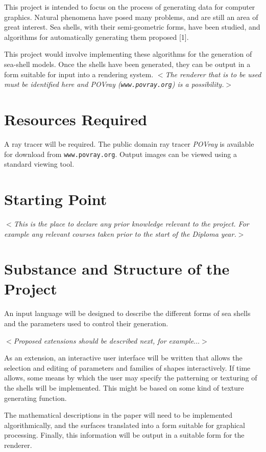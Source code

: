 \documentclass[12pt]{article}
\newcommand{\al}{$<$}
\newcommand{\ar}{$>$}
\begin{document}
This project is intended to focus on the process of generating data
for computer graphics. Natural phenomena have posed many problems, and
are still an area of great interest.  Sea shells, with their
semi-geometric forms, have been studied, and algorithms for
automatically generating them proposed [1].

This project would involve implementing these algorithms for the
generation of sea-shell models.  Once the shells have been generated,
they can be output in a form suitable for input into a rendering
system.  \al\emph{The renderer that is to be used must be identified
here and\/ {\rm POVray ({\tt www.povray.org})} is a possibility.}\ar


\section*{Resources Required}

A ray tracer will be required.  The public domain ray tracer
\emph{POVray} is available for download from {\tt www.povray.org}.
Output images can be viewed using a standard viewing tool.


\section*{Starting Point}

\al\emph{This is the place to declare any prior knowledge relevant to
  the project.  For example any relevant courses taken prior to the
  start of the Diploma year.}\ar


\section*{Substance and Structure of the Project}

An input language will be designed to describe the different forms of
sea shells and the parameters used to control their generation.

\al\emph{Proposed extensions should be described next, for
  example$\ldots$}\ar

As an extension, an interactive user interface will be written that
allows the selection and editing of parameters and families of shapes
interactively.  If time allows, some means by which the user may
specify the patterning or texturing of the shells will be implemented.
This might be based on some kind of texture generating function.

The mathematical descriptions in the paper will need to be implemented
algorithmically, and the surfaces translated into a form suitable for
graphical processing.  Finally, this information will be output in a
suitable form for the renderer.
\end{document}
